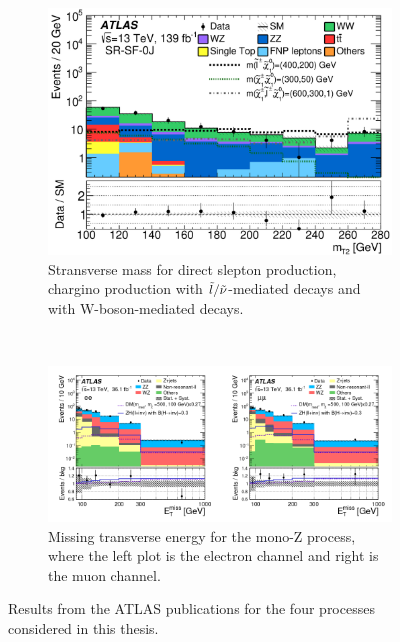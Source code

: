 \begin{figure}[H]
\centering
    \begin{subfigure}[H]{0.49\textwidth}
        \includegraphics[width=\textwidth]{Figures/FromOnline/atlasmt2SUSY.png}
    \caption{Stransverse mass for direct slepton production, chargino production with $\Tilde{l}/\Tilde{\nu}$-mediated decays and with W-boson-mediated decays.}
    \label{fig:atlasSUSY}
    \end{subfigure}
    \\
    \begin{subfigure}[H]{\textwidth}
        \includegraphics[width=\textwidth]{Figures/FromOnline/atlasmetDM.png}
    \caption{Missing transverse energy for the mono-Z process, where the left plot is the electron channel and right is the muon channel.}
    \label{fig:atlasDM}
    \end{subfigure}
    \caption{Results from the ATLAS publications for the four processes considered in this thesis.}
    \label{fig:atlaspub}
\end{figure}

